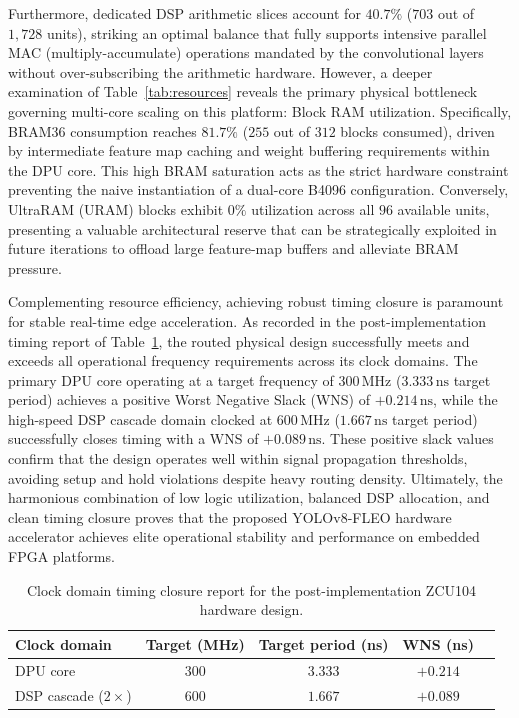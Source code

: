 \documentclass[algorithms,article,submit,moreauthors]{Definitions/mdpi}
\begin{document}
Furthermore, dedicated DSP arithmetic slices account for $40.7\%$ ($703$ out of $1{,}728$ units), striking an optimal balance that fully supports intensive parallel MAC (multiply-accumulate) operations mandated by the convolutional layers without over-subscribing the arithmetic hardware. However, a deeper examination of Table~\ref{tab:resources} reveals the primary physical bottleneck governing multi-core scaling on this platform: Block RAM utilization. Specifically, BRAM36 consumption reaches $81.7\%$ ($255$ out of $312$ blocks consumed), driven by intermediate feature map caching and weight buffering requirements within the DPU core. This high BRAM saturation acts as the strict hardware constraint preventing the naive instantiation of a dual-core B4096 configuration. Conversely, UltraRAM (URAM) blocks exhibit $0\%$ utilization across all $96$ available units, presenting a valuable architectural reserve that can be strategically exploited in future iterations to offload large feature-map buffers and alleviate BRAM pressure.

Complementing resource efficiency, achieving robust timing closure is paramount for stable real-time edge acceleration. As recorded in the post-implementation timing report of Table~\ref{tab:timing}, the routed physical design successfully meets and exceeds all operational frequency requirements across its clock domains. The primary DPU core operating at a target frequency of $300\,\text{MHz}$ ($3.333\,\text{ns}$ target period) achieves a positive Worst Negative Slack (WNS) of $+0.214\,\text{ns}$, while the high-speed DSP cascade domain clocked at $600\,\text{MHz}$ ($1.667\,\text{ns}$ target period) successfully closes timing with a WNS of $+0.089\,\text{ns}$. These positive slack values confirm that the design operates well within signal propagation thresholds, avoiding setup and hold violations despite heavy routing density. Ultimately, the harmonious combination of low logic utilization, balanced DSP allocation, and clean timing closure proves that the proposed YOLOv8-FLEO hardware accelerator achieves elite operational stability and performance on embedded FPGA platforms.

\begin{table}[ h!]
\centering
\caption{Clock domain timing closure report for the post-implementation ZCU104 hardware design.}
\label{tab:timing}
\setlength{\tabcolsep}{6pt}\renewcommand{\arraystretch}{1.2}
\begin{tabular}{lcccc}
\toprule
Clock domain & Target (MHz) & Target period (ns) & WNS (ns) \\
\midrule
DPU core        & $300$ & $3.333$ & $+0.214$ \\
DSP cascade ($2\times$) & $600$ & $1.667$ & $+0.089$ \\
\bottomrule
\end{tabular}
\end{table}
\end{document}
